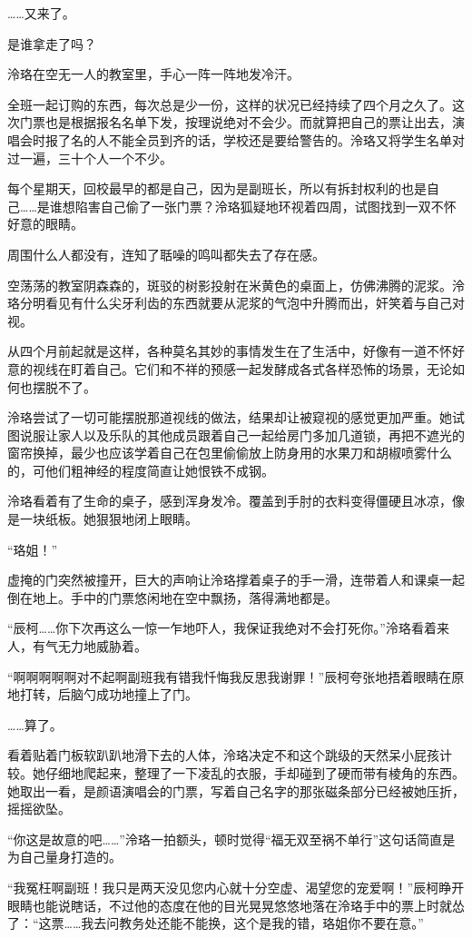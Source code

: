 \documentclass[UTF8, scheme = chinese, openany]{ctexbook}
\begin{document}
……又来了。

是谁拿走了吗？

泠珞在空无一人的教室里，手心一阵一阵地发冷汗。

全班一起订购的东西，每次总是少一份，这样的状况已经持续了四个月之久了。这次门票也是根据报名名单下发，按理说绝对不会少。而就算把自己的票让出去，演唱会时报了名的人不能全员到齐的话，学校还是要给警告的。泠珞又将学生名单对过一遍，三十个人一个不少。

每个星期天，回校最早的都是自己，因为是副班长，所以有拆封权利的也是自己……是谁想陷害自己偷了一张门票？泠珞狐疑地环视着四周，试图找到一双不怀好意的眼睛。

周围什么人都没有，连知了聒噪的鸣叫都失去了存在感。

空荡荡的教室阴森森的，斑驳的树影投射在米黄色的桌面上，仿佛沸腾的泥浆。泠珞分明看见有什么尖牙利齿的东西就要从泥浆的气泡中升腾而出，奸笑着与自己对视。

从四个月前起就是这样，各种莫名其妙的事情发生在了生活中，好像有一道不怀好意的视线在盯着自己。它们和不祥的预感一起发酵成各式各样恐怖的场景，无论如何也摆脱不了。

泠珞尝试了一切可能摆脱那道视线的做法，结果却让被窥视的感觉更加严重。她试图说服让家人以及乐队的其他成员跟着自己一起给房门多加几道锁，再把不遮光的窗帘换掉，最少也应该学着自己在包里偷偷放上防身用的水果刀和胡椒喷雾什么的，可他们粗神经的程度简直让她恨铁不成钢。

泠珞看着有了生命的桌子，感到浑身发冷。覆盖到手肘的衣料变得僵硬且冰凉，像是一块纸板。她狠狠地闭上眼睛。

“珞姐！”

虚掩的门突然被撞开，巨大的声响让泠珞撑着桌子的手一滑，连带着人和课桌一起倒在地上。手中的门票悠闲地在空中飘扬，落得满地都是。

“辰柯……你下次再这么一惊一乍地吓人，我保证我绝对不会打死你。”泠珞看着来人，有气无力地威胁着。

“啊啊啊啊啊对不起啊副班我有错我忏悔我反思我谢罪！”辰柯夸张地捂着眼睛在原地打转，后脑勺成功地撞上了门。

……算了。

看着贴着门板软趴趴地滑下去的人体，泠珞决定不和这个跳级的天然呆小屁孩计较。她仔细地爬起来，整理了一下凌乱的衣服，手却碰到了硬而带有棱角的东西。她取出一看，是颜语演唱会的门票，写着自己名字的那张磁条部分已经被她压折，摇摇欲坠。

“你这是故意的吧……”泠珞一拍额头，顿时觉得“福无双至祸不单行”这句话简直是为自己量身打造的。

“我冤枉啊副班！我只是两天没见您内心就十分空虚、渴望您的宠爱啊！”辰柯睁开眼睛也能说瞎话，不过他的态度在他的目光晃晃悠悠地落在泠珞手中的票上时就怂了：“这票……我去问教务处还能不能换，这个是我的错，珞姐你不要在意。”
\end{document}
